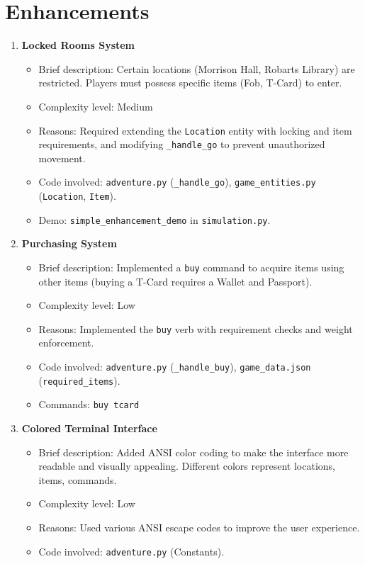 \documentclass[11pt]{article}
\begin{document}
\section*{Enhancements}
\begin{enumerate}
    \item \textbf{Locked Rooms System}
    \begin{itemize}
        \item Brief description: Certain locations (Morrison Hall, Robarts Library) are restricted. Players must possess specific items (Fob, T-Card) to enter.
        \item Complexity level: Medium
        \item Reasons: Required extending the \texttt{Location} entity with locking and item requirements, and modifying \texttt{\_handle\_go} to prevent unauthorized movement.
        \item Code involved: \texttt{adventure.py} (\texttt{\_handle\_go}), \texttt{game\_entities.py} (\texttt{Location}, \texttt{Item}).
        \item Demo: \texttt{simple\_enhancement\_demo} in \texttt{simulation.py}.
    \end{itemize}
    
    \item \textbf{Purchasing System}
    \begin{itemize}
        \item Brief description: Implemented a \texttt{buy} command to acquire items using other items (buying a T-Card requires a Wallet and Passport).
        \item Complexity level: Low
        \item Reasons: Implemented the \texttt{buy} verb with requirement checks and weight enforcement.
        \item Code involved: \texttt{adventure.py} (\texttt{\_handle\_buy}), \texttt{game\_data.json} (\texttt{required\_items}).
        \item Commands: \texttt{buy tcard}
    \end{itemize}
    
    \item \textbf{Colored Terminal Interface}
    \begin{itemize}
        \item Brief description: Added ANSI color coding to make the interface more readable and visually appealing. Different colors represent locations, items, commands.
        \item Complexity level: Low
        \item Reasons: Used various ANSI escape codes to improve the user experience.
        \item Code involved: \texttt{adventure.py} (Constants).
    \end{itemize}
    

\end{enumerate}
\end{document}
